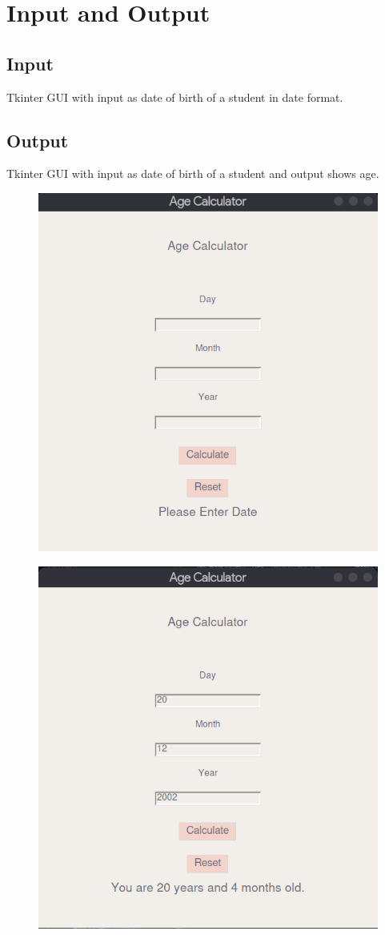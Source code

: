 \documentclass[11pt]{article}
\begin{document}
\section{Input and Output}
\subsection{Input}
Tkinter GUI with input as date of birth of a student in date format.

\subsection{Output}
Tkinter GUI with input as date of birth of a student and output shows age.

\begin{figure}[H]
    \centering
    \includegraphics[width=.55\textwidth]{./Screenshot_on_2023-04-24_at_11-47-44.png}
    \caption{}
\end{figure}

\begin{figure}[H]
    \centering
    \includegraphics[width=.55\textwidth]{Screenshot_on_2023-04-24_at_11-48-02.png}
    \caption{}
\end{figure}
\end{document}
